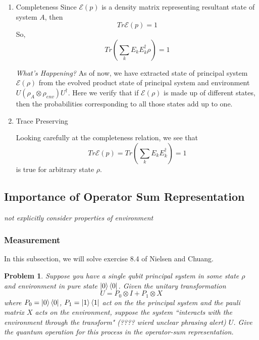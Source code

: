 \documentclass{article}
\newtheorem{problem}{Problem}
\begin{document}
\begin{enumerate}
  \item Completeness
    Since \(\mathcal{E}(p)\) is a density matrix representing resultant state of
    system \(A\), then
    \[Tr\mathcal{E}(p) = 1\]
    So,
    \[Tr(\sum_k E_k E^{\dagger}_k \rho) = 1\]

    \textit{What's Happening?} As of now, we have extracted state of principal system \(\mathcal{E}(\rho)\)
    from the evolved product state of principal system and environment \(U(\rho_A \otimes \rho_{env})U^{\dagger}\). Here we verify that if \(\mathcal{E}(\rho)\) is made up of
    different states, then the probabilities corresponding to all those states add up to one.

  \item Trace Preserving

  Looking carefully at the completeness relation, we see that
  \[Tr\mathcal{E}(p) = Tr (\sum_k E_k E^{\dagger}_k) = 1\]
  is true for arbitrary state \(\rho\).
\end{enumerate}
\subsection*{Importance of Operator Sum Representation}
\textit{not explicitly consider properties of environment}

\subsubsection*{Measurement}
In this subsection, we will solve exercise 8.4 of Nielsen and Chuang.
\begin{problem}
  Suppose you have a single qubit
  principal system in some state \(\rho\) and environment
  in pure state \(\ket{0}\bra{0}\). Given the unitary transformation
  \[U = P_0 \otimes I  + P_1 \otimes X\]
  where \(P_0 = \ket{0}\bra{0}\), \(P_1 = \ket{1}\bra{1}\) act on the
  the principal system and the pauli matrix \(X\) acts on the environment,
  suppose the system ``interacts with the environment through the transform"
  (???? \textit{wierd unclear phrasing alert}) \(U\). Give the quantum
  operation for this process in the operator-sum representation.
\end{problem}
\end{document}
